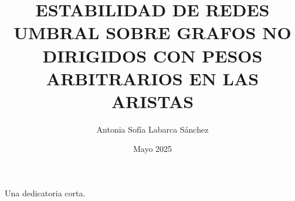 \documentclass[upright, contnum]{umemoria}
\author{Antonia Sofía Labarca Sánchez}
\title{ESTABILIDAD DE REDES UMBRAL SOBRE GRAFOS NO DIRIGIDOS CON PESOS ARBITRARIOS EN LAS ARISTAS}
\date{Mayo 2025}
\begin{document}
\frontmatter
\maketitle

\begin{abstract}

\end{abstract}

\begin{dedicatoria}
Una dedicatoria corta.
\end{dedicatoria}

\begin{thanks}

\end{thanks}

\cleardoublepage
\tableofcontents

\mainmatter







\nocite{*}

\end{document}
